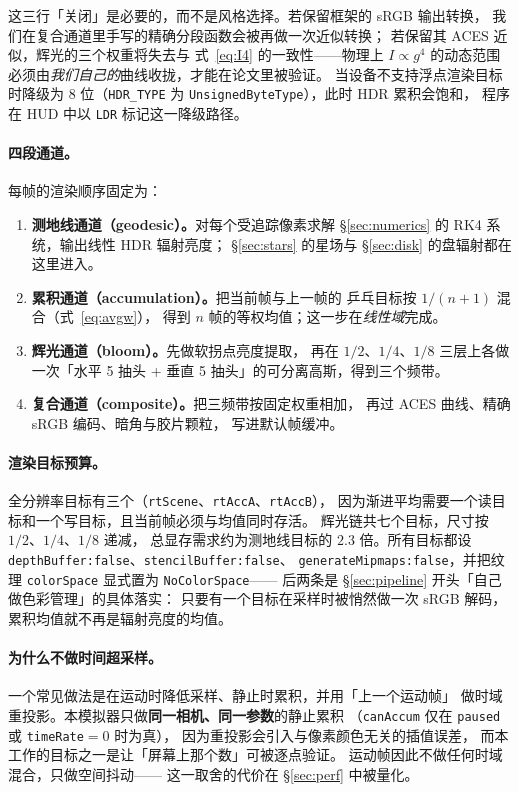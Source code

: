 \noindent
这三行「关闭」是必要的，而不是风格选择。若保留框架的 sRGB 输出转换，
我们在复合通道里手写的精确分段函数会被再做一次近似转换；
若保留其 ACES 近似，辉光的三个权重将失去与
式~\eqref{eq:I4} 的一致性——物理上 $I\propto g^{4}$ 的动态范围
必须由\emph{我们自己的}曲线收拢，才能在论文里被验证。
当设备不支持浮点渲染目标时降级为 8 位（\texttt{HDR\_TYPE}
为 \texttt{UnsignedByteType}），此时 HDR 累积会饱和，
程序在 HUD 中以 \texttt{LDR} 标记这一降级路径。

\paragraph{四段通道。}
每帧的渲染顺序固定为：

\begin{enumerate}[leftmargin=1.6em,itemsep=2pt,topsep=3pt]
\item \textbf{测地线通道（geodesic）。}对每个受追踪像素求解
      §\ref{sec:numerics} 的 RK4 系统，输出线性 HDR 辐射亮度；
      §\ref{sec:stars} 的星场与 §\ref{sec:disk} 的盘辐射都在这里进入。
\item \textbf{累积通道（accumulation）。}把当前帧与上一帧的
      乒乓目标按 $1/(n+1)$ 混合（式~\eqref{eq:avgw}），
      得到 $n$ 帧的等权均值；这一步在\emph{线性域}完成。
\item \textbf{辉光通道（bloom）。}先做软拐点亮度提取，
      再在 $1/2$、$1/4$、$1/8$ 三层上各做一次「水平 5 抽头 +
      垂直 5 抽头」的可分离高斯，得到三个频带。
\item \textbf{复合通道（composite）。}把三频带按固定权重相加，
      再过 ACES 曲线、精确 sRGB 编码、暗角与胶片颗粒，
      写进默认帧缓冲。
\end{enumerate}

\paragraph{渲染目标预算。}
全分辨率目标有三个（\texttt{rtScene}、\texttt{rtAccA}、\texttt{rtAccB}），
因为渐进平均需要一个读目标和一个写目标，且当前帧必须与均值同时存活。
辉光链共七个目标，尺寸按 $1/2$、$1/4$、$1/8$ 递减，
总显存需求约为测地线目标的 $2.3$ 倍。所有目标都设
\texttt{depthBuffer:false}、\texttt{stencilBuffer:false}、
\texttt{generateMipmaps:false}，并把纹理
\texttt{colorSpace} 显式置为 \texttt{NoColorSpace}——
后两条是 \S\ref{sec:pipeline} 开头「自己做色彩管理」的具体落实：
只要有一个目标在采样时被悄然做一次 sRGB 解码，
累积均值就不再是辐射亮度的均值。

\paragraph{为什么不做时间超采样。}
一个常见做法是在运动时降低采样、静止时累积，并用「上一个运动帧」
做时域重投影。本模拟器只做\textbf{同一相机、同一参数}的静止累积
（\texttt{canAccum} 仅在 \texttt{paused} 或 \texttt{timeRate}$=0$ 时为真），
因为重投影会引入与像素颜色无关的插值误差，
而本工作的目标之一是让「屏幕上那个数」可被逐点验证。
运动帧因此不做任何时域混合，只做空间抖动——
这一取舍的代价在 §\ref{sec:perf} 中被量化。

